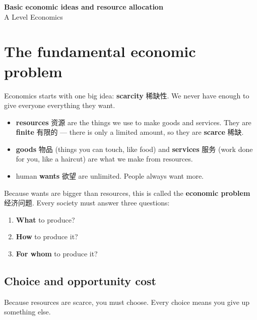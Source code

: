 \documentclass[11pt]{article}
\begin{document}
\begin{center}
  {\LARGE\bfseries Basic economic ideas and resource allocation}\\[0.35em]
  {\large A Level Economics}
\end{center}
\vspace{0.6em}

\section*{The fundamental economic problem}

Economics starts with one big idea: \textbf{scarcity} 稀缺性. We never have enough to give everyone everything they want.

\begin{itemize}
\item \textbf{resources} 资源 are the things we use to make goods and services. They are \textbf{finite} 有限的 — there is only a limited amount, so they are \textbf{scarce} 稀缺.

\item \textbf{goods} 物品 (things you can touch, like food) and \textbf{services} 服务 (work done for you, like a haircut) are what we make from resources.

\item human \textbf{wants} 欲望 are unlimited. People always want more.

\end{itemize}

Because wants are bigger than resources, this is called the \textbf{economic problem} 经济问题. Every society must answer three questions:

\begin{enumerate}
\item \textbf{What} to produce?

\item \textbf{How} to produce it?

\item \textbf{For whom} to produce it?

\end{enumerate}

\subsection*{Choice and opportunity cost}

Because resources are scarce, you must choose. Every choice means you give up something else.
\end{document}
